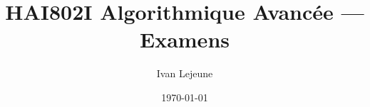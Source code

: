 






\title{\color{astral} \sffamily \bfseries HAI802I Algorithmique Avancée --- Examens}
\author{Ivan Lejeune}
\date{\today}

\toggletrue{showsolutions}


    \maketitle
    \tableofcontents

    \listofalgorithms %

    \listofproblems %

    \newpage
    \setcounter{tdcounter}{0}
    
    



